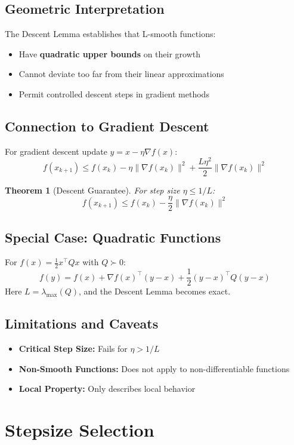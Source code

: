 \documentclass{article}
\newtheorem{theorem}{Theorem}
\begin{document}
\subsection{Geometric Interpretation}
The Descent Lemma establishes that L-smooth functions:
\begin{itemize}
\item Have \textbf{quadratic upper bounds} on their growth
\item Cannot deviate too far from their linear approximations
\item Permit controlled descent steps in gradient methods
\end{itemize}

\subsection{Connection to Gradient Descent}
For gradient descent update \( y = x - \eta \nabla f(x) \):
\[
f(x_{k+1}) \leq f(x_k) - \eta \|\nabla f(x_k)\|^2 + \frac{L\eta^2}{2} \|\nabla f(x_k)\|^2
\]
\begin{theorem}[Descent Guarantee]
For step size \( \eta \leq 1/L \):
\[
f(x_{k+1}) \leq f(x_k) - \frac{\eta}{2} \|\nabla f(x_k)\|^2
\]
\end{theorem}

\subsection{Special Case: Quadratic Functions}
For \( f(x) = \frac{1}{2}x^\top Q x \) with \( Q \succ 0 \):
\[
f(y) = f(x) + \nabla f(x)^\top (y - x) + \frac{1}{2}(y - x)^\top Q (y - x)
\]
Here \( L = \lambda_{\text{max}}(Q) \), and the Descent Lemma becomes exact.

\subsection{Limitations and Caveats}
\begin{itemize}
\item \textbf{Critical Step Size:} Fails for \( \eta > 1/L \)
\item \textbf{Non-Smooth Functions:} Does not apply to non-differentiable functions
\item \textbf{Local Property:} Only describes local behavior
\end{itemize}

\section{Stepsize Selection}
\end{document}
